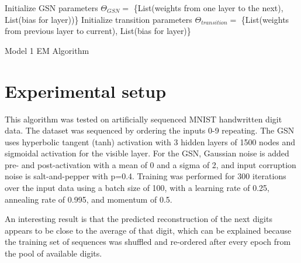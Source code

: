 \begin{algorithm}[h!]
	Initialize GSN parameters \(\Theta_{GSN} = \) \{List(weights from one layer to the next), List(bias for layer))\}\;
	Initialize transition parameters \(\Theta_{transition}=\) \{List(weights from previous layer to current), List(bias for layer)\} \;
	\caption{ Model 1 EM Algorithm }
\end{algorithm}

\section{Experimental setup}

This algorithm was tested on artificially sequenced MNIST handwritten digit data. The dataset was sequenced by ordering the inputs 0-9 repeating. The GSN uses hyperbolic tangent (tanh) activation with 3 hidden layers of 1500 nodes and sigmoidal activation for the visible layer. For the GSN, Gaussian noise is added pre- and post-activation with a mean of 0 and a sigma of 2, and input corruption noise is salt-and-pepper with p=0.4. Training was performed for 300 iterations over the input data using a batch size of 100, with a learning rate of 0.25, annealing rate of 0.995, and momentum of 0.5.

An interesting result is that the predicted reconstruction of the next digits appears to be close to the average of that digit, which can be explained because the training set of sequences was shuffled and re-ordered after every epoch from the pool of available digits.

